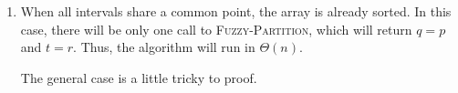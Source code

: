 \documentclass{report}
\makeatletter
\renewenvironment{framed}{%
 \def\FrameCommand##1{\hskip\@totalleftmargin
 \fboxsep=\FrameSep\fbox{##1}}%
 \MakeFramed {\advance\hsize-\width
   \@totalleftmargin\z@ \linewidth\hsize
   \@setminipage}}%
 {\par\unskip\endMakeFramed}
\let\oldnl\nl%
\newcommand{\nonl}{\renewcommand{\nl}{\let\nl\oldnl}}%
\makeatother
\begin{document}
\begin{enumerate}
\begin{framed}
\begin{enumerate}
{\begin{algorithm}[H]
\SetAlgoNoEnd\DontPrintSemicolon
\BlankLine
{}
\nonl{}
\end{algorithm}

\begin{algorithm}[H]
\SetAlgoNoEnd\DontPrintSemicolon
\BlankLine
{}
\nonl{}
\end{algorithm}
}

\newpage

\item{When all intervals share a common point, the array is already sorted. In
this case, there will be only one call to \textsc{Fuzzy-Partition}, which will
return $q = p$ and $t = r$. Thus, the algorithm will run in $\Theta(n)$.

The general case is a little tricky to proof.}
\end{enumerate}
\end{framed}

\end{enumerate}
\end{document}
